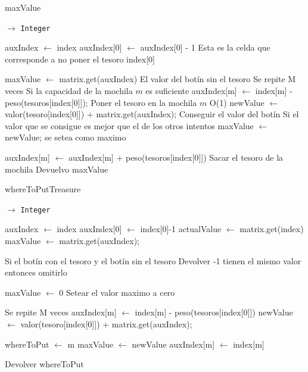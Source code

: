 \begin{algorithm}[H]
\caption{maxValue}
\begin{algorithmic}
 
   $\to $ \texttt{Integer}
 		
 		\State auxIndex $\gets$ index
		\State auxIndex[0] $\gets$ auxIndex[0] - 1 \Comment Esta es la celda que corresponde a no poner el tesoro index[0]

        \State maxValue $\gets$ matrix.get(auxIndex) \Comment El valor del botín sin el tesoro
          \Comment Se repite M veces
			 \Comment Si la capacidad de la mochila $m$ es suficiente
			\State	auxIndex[m] $\gets$ index[m] - peso(tesoros[index[0]]); \Comment Poner el tesoro en la mochila $m$ O(1)
			\State	newValue $\gets$  valor(tesoro[index[0]]) + matrix.get(auxIndex); \Comment Conseguir el valor del botín  \Comment Si el valor que se consigue es mejor que el de los otros intentos
			\State maxValue $\gets$ newValue; \Comment se setea como maximo
			\EndIf
			
			\State auxIndex[m] $\gets$ auxIndex[m] + peso(tesoros[index[0]]) 	\Comment Sacar el tesoro de la mochila
			\EndIf
		\EndFor
    	\State Devuelvo maxValue
	\EndProcedure
 \end{algorithmic}
\end{algorithm}

\begin{algorithm}[H]
\caption{whereToPutTreasure}
\begin{algorithmic}[1]
   $\to $ \texttt{Integer}

    \State auxIndex $\gets$ index 
    \State auxIndex[0] $\gets$ index[0]-1 
	\State actualValue $\gets$ matrix.get(index)
	\State maxValue $\gets$ matrix.get(auxIndex);
	
	    \Comment Si el botín con el tesoro y el botín sin el tesoro
	    	\State Devolver -1  \Comment  tienen el mismo valor entonces omitirlo
	\EndIf
		
	\State	maxValue $\gets$ 0  \Comment Setear el valor maximo a cero

      \Comment Se repite M veces
		\State	auxIndex[m] $\gets$ index[m] - peso(tesoros[index[0]])
		\State	newValue $\gets$  valor(tesoro[index[0]]) + matrix.get(auxIndex);

            \State	whereToPut $\gets$ m 
            \State	maxValue $\gets$ newValue
		\EndIf
		\State	auxIndex[m] $\gets$ index[m] 
    \EndIf
	\EndFor
		
	\State	Devolver whereToPut
\EndProcedure
\end{algorithmic}
\end{algorithm}

